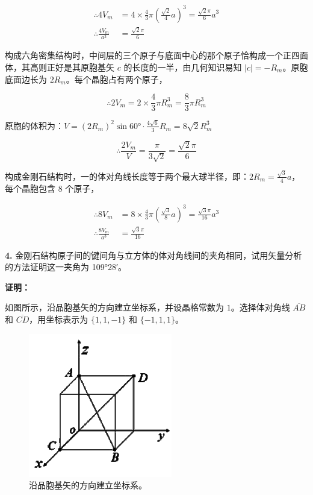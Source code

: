 \begin{align*}
    \therefore 4 V_m &= 4 \times \frac{4}{3} \pi \left(\frac{\sqrt{2}}{4} a\right)^3 = \frac{\sqrt{2}\pi}{6} a^3 \\
    \therefore \frac{4 V_m}{a^3} &= \frac{\sqrt{2}\pi}{6}
\end{align*}

构成六角密集结构时，中间层的三个原子与底面中心的那个原子恰构成一个正四面体，其高则正好是其原胞基矢 $c$ 的长度的一半，由几何知识易知 $|c|=-R_m$。原胞底面边长为 $2 R_m$。每个晶胞占有两个原子，

\begin{equation*}
    \therefore 2 V_m = 2 \times \frac{4}{3} \pi R_m^3 = \frac{8}{3} \pi R_m^3
\end{equation*}

原胞的体积为：$V=(2 R_m)^2 \sin \ang{60} \cdot \frac{4\sqrt{6}}{3} R_m = 8\sqrt{2} R_m^3$

\begin{equation*}
    \therefore \frac{2 V_m}{V} = \frac{\pi}{3\sqrt{2}} = \frac{\sqrt{2}\pi}{6}
\end{equation*}

构成金刚石结构时，一的体对角线长度等于两个最大球半径，即：$2 R_m=\frac{\sqrt{3}}{4} a$，每个晶胞包含 $8$ 个原子，

\begin{align*}
    \therefore 8 V_m &= 8 \times \frac{4}{3} \pi \left(\frac{\sqrt{3}}{8} a\right)^3 = \frac{\sqrt{3}\pi}{16} a^3 \\
    \therefore \frac{8 V_m}{a^3} &= \frac{\sqrt{3}\pi}{16}
\end{align*}

\noindent \textbf{4.\quad} 金刚石结构原子间的键间角与立方体的体对角线间的夹角相同，试用矢量分析的方法证明这一夹角为 \ang{109;28}。

\noindent \textbf{证明：}

如图所示，沿品胞基矢的方向建立坐标系，并设晶格常数为 $1$。选择体对角线 $\overline{AB}$ 和 $\overline{CD}$，用坐标表示为 $\{1, 1, -1\}$ 和 $\{-1, 1, 1\}$。

\begin{figure}[htbp]
    \centering
    \includegraphics{pic/坐标系1.png}
    \caption{沿品胞基矢的方向建立坐标系。}
    \label{fig:1.2}
\end{figure}

